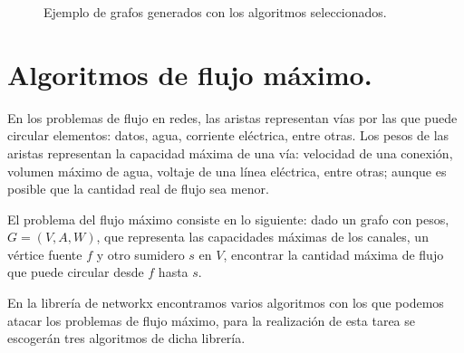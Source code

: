 \documentclass{article}
\begin{document}
\begin{figure}[h]

\caption{Ejemplo de grafos generados con los algoritmos seleccionados.}
\label{fig2} 
\end{figure}


\newpage
\section{Algoritmos de flujo máximo.}
En los problemas de flujo en redes, las aristas representan vías por las que puede circular elementos: datos, agua, corriente eléctrica, entre otras. Los pesos de las aristas representan la capacidad máxima de una vía: velocidad de una conexión, volumen máximo de agua, voltaje de una línea eléctrica, entre otras; aunque es posible que la cantidad real de flujo sea menor.
 
El problema del flujo máximo consiste en lo siguiente: dado un grafo con pesos, $G = (V, A, W)$, que representa las capacidades máximas de los canales, un vértice fuente $f$ y otro sumidero $s$ en $ V $, encontrar la cantidad máxima de flujo que puede circular desde $f$ hasta $s$.

En la librería de networkx encontramos varios algoritmos con los que podemos atacar los problemas de flujo máximo, para la realización de esta tarea se escogerán tres algoritmos de dicha librería.
\end{document}

